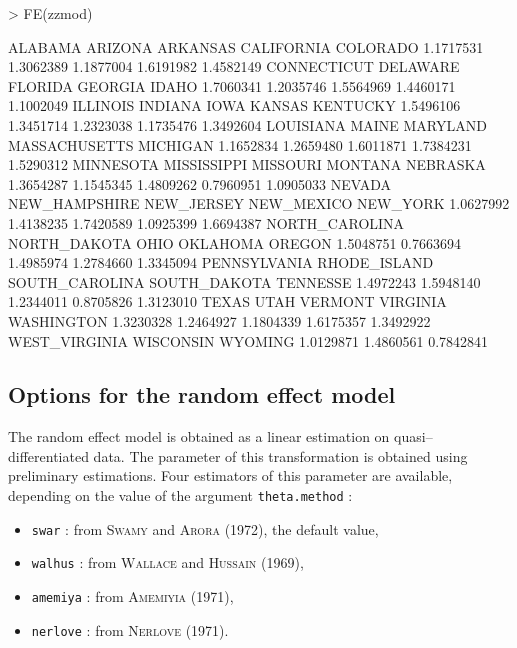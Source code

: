 \documentclass{article}
\begin{document}
\begin{Schunk}
\begin{Sinput}
> FE(zzmod)
\end{Sinput}
\begin{Soutput}
       ALABAMA        ARIZONA       ARKANSAS     CALIFORNIA       COLORADO 
     1.1717531      1.3062389      1.1877004      1.6191982      1.4582149 
   CONNECTICUT       DELAWARE        FLORIDA        GEORGIA          IDAHO 
     1.7060341      1.2035746      1.5564969      1.4460171      1.1002049 
      ILLINOIS        INDIANA           IOWA         KANSAS       KENTUCKY 
     1.5496106      1.3451714      1.2323038      1.1735476      1.3492604 
     LOUISIANA          MAINE       MARYLAND  MASSACHUSETTS       MICHIGAN 
     1.1652834      1.2659480      1.6011871      1.7384231      1.5290312 
     MINNESOTA    MISSISSIPPI       MISSOURI        MONTANA       NEBRASKA 
     1.3654287      1.1545345      1.4809262      0.7960951      1.0905033 
        NEVADA  NEW_HAMPSHIRE     NEW_JERSEY     NEW_MEXICO       NEW_YORK 
     1.0627992      1.4138235      1.7420589      1.0925399      1.6694387 
NORTH_CAROLINA   NORTH_DAKOTA           OHIO       OKLAHOMA         OREGON 
     1.5048751      0.7663694      1.4985974      1.2784660      1.3345094 
  PENNSYLVANIA   RHODE_ISLAND SOUTH_CAROLINA   SOUTH_DAKOTA       TENNESSE 
     1.4972243      1.5948140      1.2344011      0.8705826      1.3123010 
         TEXAS           UTAH        VERMONT       VIRGINIA     WASHINGTON 
     1.3230328      1.2464927      1.1804339      1.6175357      1.3492922 
 WEST_VIRGINIA      WISCONSIN        WYOMING 
     1.0129871      1.4860561      0.7842841 
\end{Soutput}
\end{Schunk}

\subsection{Options for the random effect model}

The random effect model is obtained as a linear estimation on
quasi--differentiated  data. The parameter of this transformation is
obtained using preliminary estimations. Four estimators of this
parameter are available, depending on the value of the argument \texttt{theta.method}  :

\begin{itemize}
\item \texttt{swar} : from \textsc{Swamy} and \textsc{Arora}
  (1972), the default value,
\item \texttt{walhus} : from \textsc{Wallace} and \textsc{Hussain} (1969),
\item \texttt{amemiya} : from \textsc{Amemiyia} (1971),
\item \texttt{nerlove} : from \textsc{Nerlove} (1971).
\end{itemize}
\end{document}
